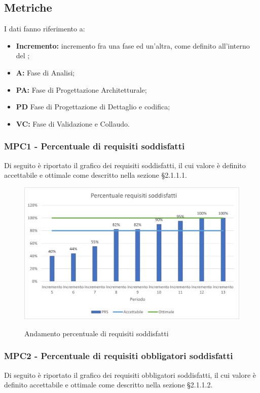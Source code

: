 \subsection{Metriche}
I dati fanno riferimento a:
\begin{itemize}
	\item \textbf{Incremento:} incremento fra una fase ed un'altra, come definito all'interno del ;
	\item \textbf{A:} Fase di Analisi;
	\item \textbf{PA:} Fase di Progettazione Architetturale;
	\item \textbf{PD} Fase di Progettazione di Dettaglio e codifica;
	\item \textbf{VC: } Fase di Validazione e Collaudo.
\end{itemize}

\subsubsection{MPC1 - Percentuale di requisiti soddisfatti}
Di seguito è riportato il grafico dei requisiti soddisfatti, il cui valore è definito accettabile e ottimale come descritto nella sezione §2.1.1.1.\\

\begin{figure}[H]
\centering
\includegraphics[scale=0.78]{res/ResocontoAttivitaDiVerifica/res/metriche/grafici/img/PRS.png}\\
\caption{Andamento percentuale di requisiti soddisfatti}
\end{figure}

\subsubsection{MPC2 - Percentuale di requisiti obbligatori soddisfatti}
Di seguito è riportato il grafico dei requisiti obbligatori soddisfatti, il cui valore è definito accettabile e ottimale come descritto nella sezione §2.1.1.2.\\

